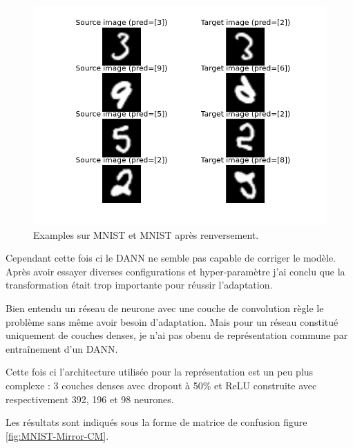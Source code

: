 \begin{figure}[htbp]
\centering
\includegraphics[width=\columnwidth]{fig/MNIST-Mirror-sample.png}
\caption{Examples sur MNIST et MNIST après renversement.}
\label{fig:MNIST-Mirror-sample}
\end{figure}

Cependant cette fois ci le DANN ne semble pas capable de corriger le modèle.
Après avoir essayer diverses configurations et hyper-paramètre j'ai conclu que
la transformation était trop importante pour réussir l'adaptation.

Bien entendu un réseau de neurone avec une couche de convolution règle le 
problème sans même avoir besoin d'adaptation. Mais pour un réseau constitué 
uniquement de couches denses, je n'ai pas obenu de représentation commune 
par entraînement d'un DANN.

Cette fois ci l'architecture utilisée pour la représentation est un peu plus 
complexe : 3 couches denses avec dropout à 50\% et ReLU construite avec 
respectivement 392, 196 et 98 neurones.

Les résultats sont indiqués sous la forme de matrice de confusion figure
\ref{fig:MNIST-Mirror-CM}.


